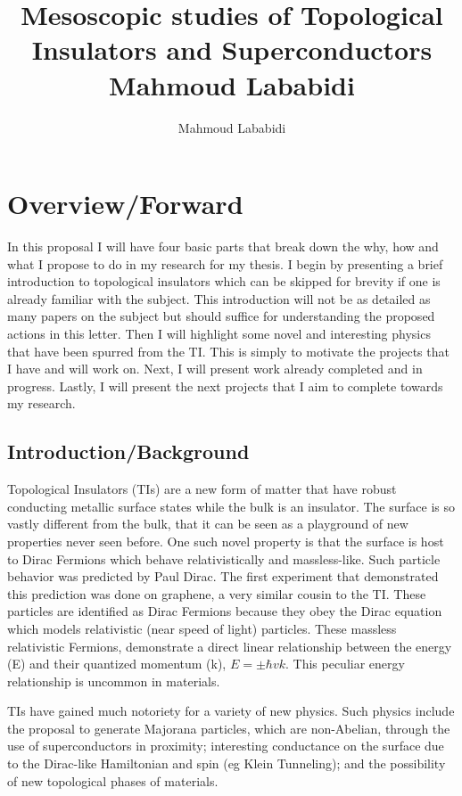 \documentclass[12pt,twocolumn]{article}
\title{Mesoscopic studies of Topological Insulators and Superconductors\\Mahmoud Lababidi}
\author{Mahmoud Lababidi}
\date{}
\begin{document}
\maketitle

\section*{Overview/Forward}
In this proposal I will have four basic parts that break down the why, how and what I propose to do in my research for my thesis. I begin by presenting a brief introduction to topological insulators which can be skipped for brevity if one is already familiar with the subject. This introduction will not be as detailed as many papers on the subject but should suffice for understanding the proposed actions in this letter. Then I will highlight some novel and interesting physics that have been spurred from the TI. This is simply to motivate the projects that I have and will work on. Next, I will present work already completed and in progress. Lastly, I will present the next projects that I aim to complete towards my research. 


\subsection*{Introduction/Background}
Topological Insulators (TIs) are a new form of matter that have robust conducting metallic surface states while the bulk is an insulator. The surface is so vastly different from the bulk, that it can be seen as a playground of new properties never seen before. One such novel property is that the surface is host to Dirac Fermions which behave relativistically and massless-like. Such particle behavior was predicted by Paul Dirac. The first experiment that demonstrated this prediction was done on graphene, a very similar cousin to the TI. These particles are identified as  Dirac Fermions because they obey the Dirac equation which models relativistic (near speed of light) particles. These massless relativistic Fermions, demonstrate a direct linear relationship between the energy (E) and their quantized momentum (k), $E=\pm\hbar v k$. This peculiar energy relationship is uncommon in  materials. 

TIs have gained much notoriety for a variety of new physics. Such physics include the proposal to generate Majorana particles, which are non-Abelian, through the use of superconductors in proximity; interesting conductance on the surface due to the Dirac-like Hamiltonian and spin (eg Klein Tunneling); and the possibility of new topological phases of materials.
\end{document}
